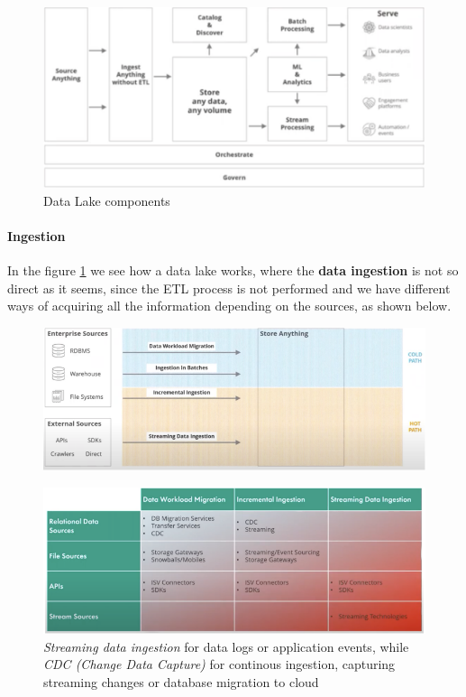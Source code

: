 \begin{figure}[ht!]
    \centering
    \includegraphics[scale=0.6]{images/data_lake_architecture.png}
    \caption{Data Lake components}
    \label{figDLstructure}
\end{figure}

\paragraph{Ingestion}
In the figure \ref{figDLstructure} we see how a data lake works, where the \textbf{data ingestion} is not so direct as it seems, since the ETL process is not performed and we have different ways of acquiring all the information depending on the sources, as shown below.
\begin{figure}[ht!]
    \centering
    \includegraphics[scale=0.73]{images/DL_data_ingestion.png}
\end{figure}
\begin{figure}[ht!]
    \centering
    \includegraphics[scale=0.73]{images/DL_data_ingestion_options.png}
    \caption{\textit{Streaming data ingestion} for data logs or application events, while \textit{CDC (Change Data Capture)} for continous ingestion, capturing streaming changes or database migration to cloud}
\end{figure}


